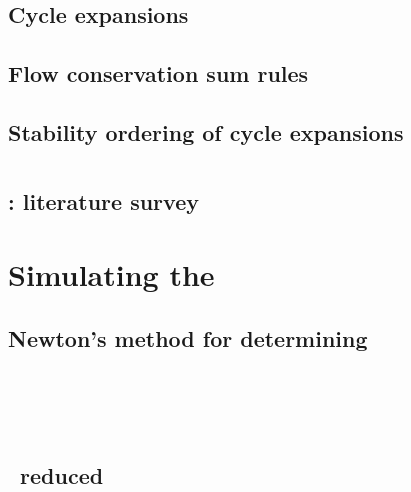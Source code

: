     \section{Cycle expansions}
        \label{sec:cycExp}
        

    \section{Flow conservation sum rules}
        \label{s-Cons-m-flow}
        

    \section{Stability ordering of cycle expansions}
        \label{s-StabOrd}
         



\chapter{\KSe}
\label{chap:KSe}
    \section{\KSe}
	\label{sec:KSe}
	
    \section{\KS: literature survey}
        \label{sec:KSlit}
        



\chapter{Simulating the \KSe}
\label{chap:Numerics}
    \section{Newton's method for determining \reqva}
        


\chapter{\KS\ \statesp}
    \section{\KS\ reduced \statesp}
	
